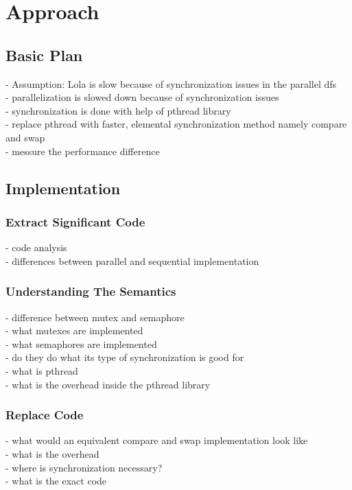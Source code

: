 \chapter{Approach}

\section{Basic Plan}
- Assumption: Lola is slow because of synchronization issues in the parallel dfs\\
- parallelization is slowed down because of synchronization issues\\
- synchronization is done with help of pthread library\\
- replace pthread with faster, elemental synchronization method namely compare and swap\\
- messure the performance difference

\section{Implementation}
\subsection{Extract Significant Code}
- code analysis\\
- differences between parallel and sequential implementation\\
\subsection{Understanding The Semantics}
- difference between mutex and semaphore\\
- what mutexes are implemented\\
- what semaphores are implemented\\
- do they do what its type of synchronization is good for\\
- what is pthread\\
- what is the overhead inside the pthread library\\
\subsection{Replace Code}
- what would an equivalent compare and swap implementation look like\\
- what is the overhead\\
- where is synchronization necessary?\\
- what is the exact code\\

